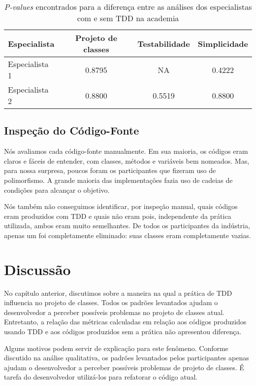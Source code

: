 \begin{table}[h!]
	\centering
	\begin{tabular}{| p{5cm} | c | c | c | }
		\hline
		Especialista & Projeto de classes & Testabilidade & Simplicidade\\
		\hline
		Especialista 1	& 0.8795 &	NA	& 0.4222\\
		Especialista 2	& 0.8800	& 0.5519 &	0.8800\\
		\hline
	\end{tabular}
	\caption{\textit{P-values} encontrados para a diferença entre as análises dos especialistas com e sem TDD na academia}
	\label{tab:especialistas-academia}
\end{table}

\subsection{Inspeção do Código-Fonte}

Nós avaliamos cada código-fonte manualmente.
Em sua maioria, os códigos eram claros e fáceis de entender,
com classes, métodos e variáveis bem nomeados.
Mas, para nossa surpresa,
poucos foram os participantes que fizeram uso de polimorfismo. A grande
maioria das implementações fazia uso de cadeias de condições para 
alcançar o objetivo.

Nós também não conseguimos identificar, por inspeção manual, quais códigos
eram produzidos com TDD e quais não eram pois, independente
da prática utilizada, ambos eram muito semelhantes.
De todos os participantes da indústria, apenas um foi completamente eliminado:
suas classes eram completamente vazias. 


\section{Discussão}

No capítulo anterior, discutimos sobre a maneira na qual a prática de TDD
influencia no projeto de classes. Todos os padrões levantados ajudam
o desenvolvedor a perceber possíveis problemas no projeto de classes atual.
Entretanto, a relação das métricas calculadas em relação aos códigos
produzidos usando TDD e aos códigos produzidos sem a prática
não apresentou diferença.

Alguns motivos podem servir de explicação para este fenômeno. Conforme discutido na análise
qualitativa, os padrões levantados pelos
participantes apenas ajudam o desenvolvedor a perceber possíveis problemas
de projeto de classes. É tarefa do desenvolvedor utilizá-los para
refatorar o código atual. 

